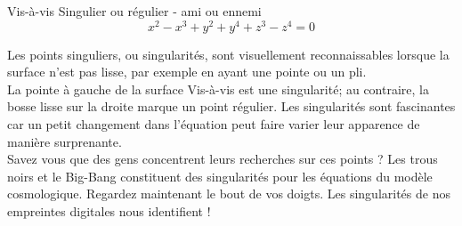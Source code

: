 \begin{surferPage}{Vis-à-vis}
Singulier ou régulier - ami ou ennemi\\
\smallskip
\[x^2	- x^3+ y^2+ y^4+ z^3- z^4	=  0\]

\vspace{0.3cm}
Les points singuliers, ou singularités, sont visuellement reconnaissables lorsque la surface n'est pas lisse, par exemple en ayant une pointe ou un pli.\\
\vspace{0.3cm}
La pointe à gauche de la surface Vis-\`a-vis est une singularité; au contraire, la bosse lisse sur la droite marque un point régulier. Les  singularités sont fascinantes car un petit changement dans l'équation peut faire varier leur apparence de manière surprenante. \\

\vspace{0.3cm}
Savez vous que des gens concentrent leurs recherches sur ces points ? Les trous noirs et le Big-Bang constituent des singularités pour les équations du modèle cosmologique. Regardez maintenant le bout de vos doigts. Les singularités de nos empreintes digitales nous identifient !
\end{surferPage}
